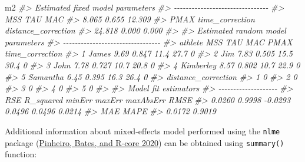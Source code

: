 \documentclass[fleqn,10pt,lineno]{wlpeerj} %
\newenvironment{Shaded}{\begin{snugshade}}{\end{snugshade}}
\newcommand{\CommentTok}[1]{\textcolor[rgb]{0.56,0.35,0.01}{\textit{#1}}}
\newcommand{\NormalTok}[1]{#1}
\begin{document}
\begin{Shaded}
\begin{Highlighting}[]
\NormalTok{m2}
\CommentTok{\#\textgreater{} Estimated fixed model parameters}
\CommentTok{\#\textgreater{} {-}{-}{-}{-}{-}{-}{-}{-}{-}{-}{-}{-}{-}{-}{-}{-}{-}{-}{-}{-}{-}{-}{-}{-}{-}{-}{-}{-}{-}{-}{-}{-}}
\CommentTok{\#\textgreater{}                 MSS                 TAU                 MAC }
\CommentTok{\#\textgreater{}               8.065               0.655              12.309 }
\CommentTok{\#\textgreater{}                PMAX     time\_correction distance\_correction }
\CommentTok{\#\textgreater{}              24.818               0.000               0.000 }
\CommentTok{\#\textgreater{} }
\CommentTok{\#\textgreater{} Estimated random model parameters}
\CommentTok{\#\textgreater{} {-}{-}{-}{-}{-}{-}{-}{-}{-}{-}{-}{-}{-}{-}{-}{-}{-}{-}{-}{-}{-}{-}{-}{-}{-}{-}{-}{-}{-}{-}{-}{-}{-}}
\CommentTok{\#\textgreater{}     athlete  MSS   TAU  MAC PMAX time\_correction}
\CommentTok{\#\textgreater{} 1     James 9.69 0.847 11.4 27.7               0}
\CommentTok{\#\textgreater{} 2       Jim 7.83 0.505 15.5 30.4               0}
\CommentTok{\#\textgreater{} 3      John 7.78 0.727 10.7 20.8               0}
\CommentTok{\#\textgreater{} 4 Kimberley 8.57 0.802 10.7 22.9               0}
\CommentTok{\#\textgreater{} 5  Samantha 6.45 0.395 16.3 26.4               0}
\CommentTok{\#\textgreater{}   distance\_correction}
\CommentTok{\#\textgreater{} 1                   0}
\CommentTok{\#\textgreater{} 2                   0}
\CommentTok{\#\textgreater{} 3                   0}
\CommentTok{\#\textgreater{} 4                   0}
\CommentTok{\#\textgreater{} 5                   0}
\CommentTok{\#\textgreater{} }
\CommentTok{\#\textgreater{} Model fit estimators}
\CommentTok{\#\textgreater{} {-}{-}{-}{-}{-}{-}{-}{-}{-}{-}{-}{-}{-}{-}{-}{-}{-}{-}{-}{-}}
\CommentTok{\#\textgreater{}       RSE R\_squared    minErr    maxErr maxAbsErr      RMSE }
\CommentTok{\#\textgreater{}    0.0260    0.9998   {-}0.0293    0.0496    0.0496    0.0214 }
\CommentTok{\#\textgreater{}       MAE      MAPE }
\CommentTok{\#\textgreater{}    0.0172    0.9019}
\end{Highlighting}
\end{Shaded}

Additional information about mixed-effects model performed using the \texttt{nlme} package (\protect\hyperlink{ref-R-nlme}{Pinheiro, Bates, and R-core 2020}) can be obtained using \texttt{summary()} function:
\end{document}
